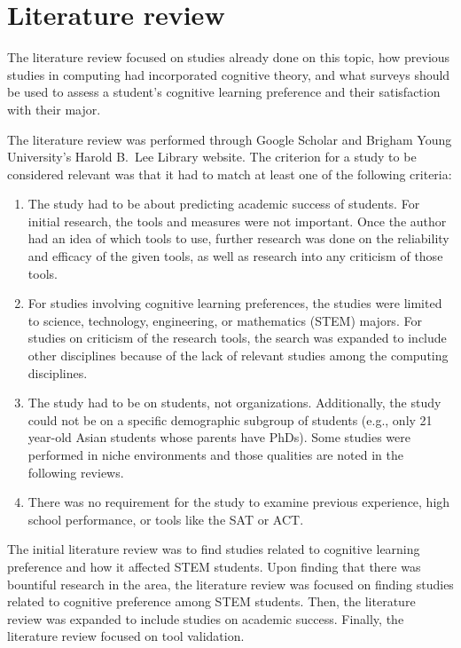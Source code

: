 \chapter{Literature review}\label{chp:chapter2}
The literature review focused on studies already done on this topic, how previous studies in computing had incorporated cognitive theory, and what surveys should be used to assess a student's cognitive learning preference and their satisfaction with their major.

The literature review was performed through Google Scholar and Brigham Young University's Harold B.\ Lee Library website. The criterion for a study to be considered relevant was that it had to match at least one of the following criteria:
\begin{enumerate}
  \item The study had to be about predicting academic success of students. For initial research, the tools and measures were not important. Once the author had an idea of which tools to use, further research was done on the reliability and efficacy of the given tools, as well as research into any criticism of those tools.
  \item For studies involving cognitive learning preferences, the studies were limited to science, technology, engineering, or mathematics (STEM) majors. For studies on criticism of the research tools, the search was expanded to include other disciplines because of the lack of relevant studies among the computing disciplines.
  \item The study had to be on students, not organizations. Additionally, the study could not be on a specific demographic subgroup of students (e.g., only 21 year-old Asian students whose parents have PhDs). Some studies were performed in niche environments and those qualities are noted in the following reviews.
  \item There was no requirement for the study to examine previous experience, high school performance, or tools like the SAT or ACT.
\end{enumerate}

The initial literature review was to find studies related to cognitive learning preference and how it affected STEM students. Upon finding that there was bountiful research in the area, the literature review was focused on finding studies related to cognitive preference among STEM students. Then, the literature review was expanded to include studies on academic success. Finally, the literature review focused on tool validation.

